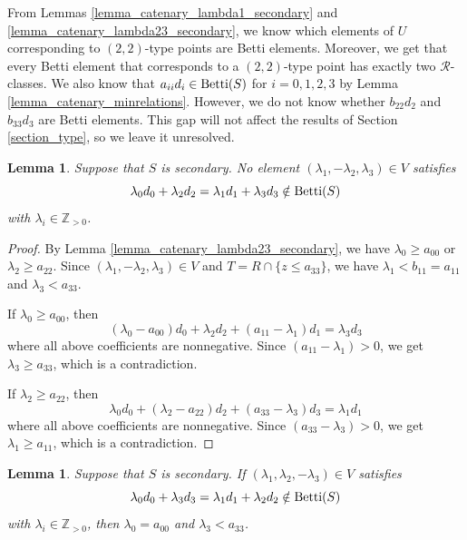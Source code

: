\documentclass[12pt]{article}
\newtheorem{lemma}[thm]{Lemma}
\theoremstyle{remark}
\begin{document}
From Lemmas \ref{lemma_catenary_lambda1_secondary} and \ref{lemma_catenary_lambda23_secondary}, we know which elements of $U$ corresponding to $(2,2)$-type points are Betti elements. Moreover, we get that every Betti element that corresponds to a $(2,2)$-type point has exactly two $\mathcal{R}$-classes. We also know that $a_{ii}d_i \in \textup{Betti}(S)$ for $i = 0,1,2,3$ by Lemma \ref{lemma_catenary_minrelations}. However, we do not know whether $b_{22}d_2$ and $b_{33}d_3$ are Betti elements. This gap will not affect the results of Section \ref{section_type}, so we leave it unresolved.



\begin{lemma}\label{lemma_catenaryT_secondary_case1}
    Suppose that $S$ is secondary. No element $(\lambda_1,-\lambda_2,\lambda_3) \in V$ satisfies
    $$ \lambda_0d_0 + \lambda_2d_2 = \lambda_1d_1 + \lambda_3d_3 \notin \textup{Betti}(S)$$
    with $\lambda_i \in \mathbb{Z}_{>0}$.
\end{lemma}
\begin{proof}
By Lemma \ref{lemma_catenary_lambda23_secondary}, we have $\lambda_0 \geq a_{00}$ or $\lambda_2 \geq a_{22}$. Since $(\lambda_1,-\lambda_2,\lambda_3) \in V$ and $T = R \cap \{z \leq a_{33}\}$, we have $\lambda_1 < b_{11} = a_{11}$ and $\lambda_3 < a_{33}$. 

If $\lambda_0\geq a_{00}$, then 
\begin{equation}
     (\lambda_0-a_{00})d_0 + \lambda_2d_2 + (a_{11}-\lambda_1)d_1 =  \lambda_3d_3 
\end{equation}
where all above coefficients are nonnegative. Since $(a_{11}-\lambda_1) > 0$, we get $\lambda_3 \geq a_{33}$, which is a contradiction.

If $\lambda_2\geq a_{22}$, then
\begin{equation}
     \lambda_0d_0 + (\lambda_2-a_{22})d_2 + (a_{33}-\lambda_3)d_3 =  \lambda_1d_1 
\end{equation}
where all above coefficients are nonnegative. Since $(a_{33}-\lambda_3) > 0$, we get $\lambda_1 \geq a_{11}$, which is a contradiction.
\end{proof}

\begin{lemma}\label{lemma_catenaryT_secondary_case2}
    Suppose that $S$ is secondary. If $(\lambda_1,\lambda_2,-\lambda_3) \in V$ satisfies
    $$ \lambda_0d_0 + \lambda_3d_3 = \lambda_1d_1 + \lambda_2d_2 \notin \textup{Betti}(S)$$
    with $\lambda_i \in \mathbb{Z}_{>0}$, then $\lambda_0 = a_{00}$ and $\lambda_3 < a_{33}$.
\end{lemma}
\end{document}
